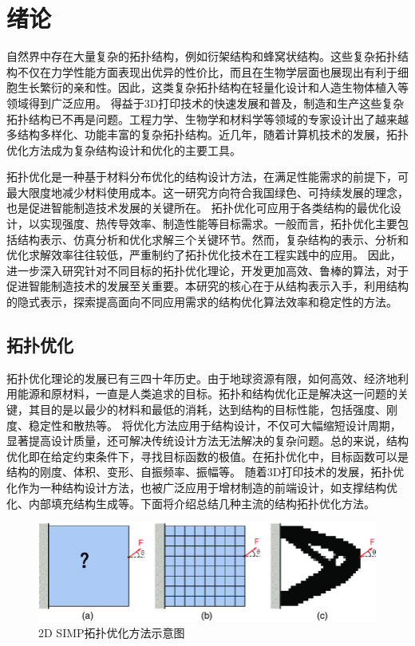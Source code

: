 
\chapter{绪论}
自然界中存在大量复杂的拓扑结构，例如衍架结构和蜂窝状结构。这些复杂拓扑结构不仅在力学性能方面表现出优异的性价比，而且在生物学层面也展现出有利于细胞生长繁衍的亲和性。因此，这类复杂拓扑结构在轻量化设计和人造生物体植入等领域得到广泛应用。
得益于3D打印技术的快速发展和普及，制造和生产这些复杂拓扑结构已不再是问题。工程力学、生物学和材料学等领域的专家设计出了越来越多结构多样化、功能丰富的复杂拓扑结构。近几年，随着计算机技术的发展，拓扑优化方法成为复杂结构设计和优化的主要工具。

拓扑优化是一种基于材料分布优化的结构设计方法，在满足性能需求的前提下，可最大限度地减少材料使用成本。这一研究方向符合我国绿色、可持续发展的理念，也是促进智能制造技术发展的关键所在。
拓扑优化可应用于各类结构的最优化设计，以实现强度、热传导效率、制造性能等目标需求。一般而言，拓扑优化主要包括结构表示、仿真分析和优化求解三个关键环节。然而，复杂结构的表示、分析和优化求解效率往往较低，严重制约了拓扑优化技术在工程实践中的应用。
因此，进一步深入研究针对不同目标的拓扑优化理论，开发更加高效、鲁棒的算法，对于促进智能制造技术的发展至关重要。本研究的核心在于从结构表示入手，利用结构的隐式表示，探索提高面向不同应用需求的结构优化算法效率和稳定性的方法。

\section{拓扑优化}
拓扑优化理论的发展已有三四十年历史。由于地球资源有限，如何高效、经济地利用能源和原材料，一直是人类追求的目标。拓扑和结构优化正是解决这一问题的关键，其目的是以最少的材料和最低的消耗，达到结构的目标性能，包括强度、刚度、稳定性和散热等。
将优化方法应用于结构设计，不仅可大幅缩短设计周期，显著提高设计质量，还可解决传统设计方法无法解决的复杂问题。总的来说，结构优化即在给定约束条件下，寻找目标函数的极值。在拓扑优化中，目标函数可以是结构的刚度、体积、变形、自振频率、振幅等。
随着3D打印技术的发展，拓扑优化作为一种结构设计方法，也被广泛应用于增材制造的前端设计，如支撑结构优化、内部填充结构生成等。下面将介绍总结几种主流的结构拓扑优化方法。
\begin{figure}[htbp]
    \centering
    \includegraphics[width=1.0\linewidth]{./figures/intro-simp}
    \caption{2D SIMP拓扑优化方法示意图~\cite{luo_simp2021}}
    \label{fig:simp}
\end{figure}
